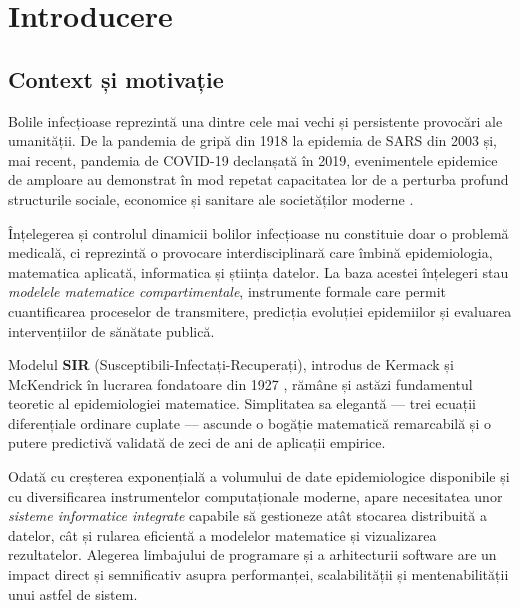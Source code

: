 
\chapter{Introducere}
\label{ch:introducere}

\section{Context și motivație}
\label{sec:context}

Bolile infecțioase reprezintă una dintre cele mai vechi și persistente provocări ale
umanității. De la pandemia de gripă din 1918 la epidemia de SARS din 2003 și,
mai recent, pandemia de COVID-19 declanșată în 2019, evenimentele epidemice de
amploare au demonstrat în mod repetat capacitatea lor de a perturba profund structurile
sociale, economice și sanitare ale societăților moderne
\cite{andersonmay1991, hethcote2000}.

Înțelegerea și controlul dinamicii bolilor infecțioase nu constituie doar o problemă
medicală, ci reprezintă o provocare interdisciplinară care îmbină epidemiologia,
matematica aplicată, informatica și știința datelor. La baza acestei înțelegeri stau
\emph{modelele matematice compartimentale}, instrumente formale care permit
cuantificarea proceselor de transmitere, predicția evoluției epidemiilor și
evaluarea intervențiilor de sănătate publică.

Modelul \textbf{SIR} (Susceptibili-Infectați-Recuperați), introdus de Kermack și
McKendrick în lucrarea fondatoare din 1927 \cite{kermack1927}, rămâne și astăzi
fundamentul teoretic al epidemiologiei matematice. Simplitatea sa elegantă ---
trei ecuații diferențiale ordinare cuplate --- ascunde o bogăție matematică
remarcabilă și o putere predictivă validată de zeci de ani de aplicații empirice.

Odată cu creșterea exponențială a volumului de date epidemiologice disponibile și
cu diversificarea instrumentelor computaționale moderne, apare necesitatea unor
\emph{sisteme informatice integrate} capabile să gestioneze atât stocarea
distribuită a datelor, cât și rularea eficientă a modelelor matematice și
vizualizarea rezultatelor. Alegerea limbajului de programare și a arhitecturii
software are un impact direct și semnificativ asupra performanței, scalabilității
și mentenabilității unui astfel de sistem.

